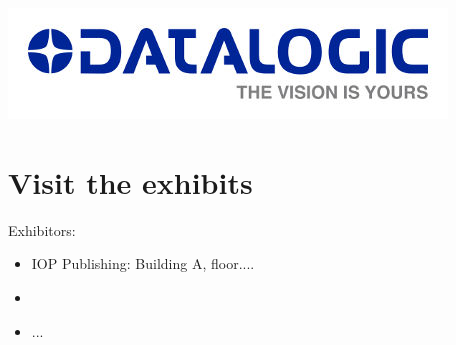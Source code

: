 \includegraphics[scale=0.9]{images/logo_DATALOGIC}\\
\section*{Visit the exhibits}
Exhibitors:
\begin{itemize}
\item IOP Publishing: Building A, floor....
\item
\item ...
\end{itemize}